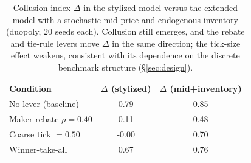 \begin{table}[t]
\centering
\caption{Collusion index $\Delta$ in the stylized model versus the extended model with a stochastic mid-price and endogenous inventory (duopoly, $20$ seeds each). Collusion still emerges, and the rebate and tie-rule levers move $\Delta$ in the same direction; the tick-size effect weakens, consistent with its dependence on the discrete benchmark structure (\S\ref{sec:design}).}
\label{tab:inventory}
\begin{tabular}{lcc}
\toprule
Condition & $\Delta$ (stylized) & $\Delta$ (mid+inventory) \\
\midrule
No lever (baseline) & 0.79 & 0.85 \\
Maker rebate $\rho=0.40$ & 0.11 & 0.48 \\
Coarse tick $=0.50$ & -0.00 & 0.70 \\
Winner-take-all & 0.67 & 0.76 \\
\bottomrule
\end{tabular}
\end{table}
